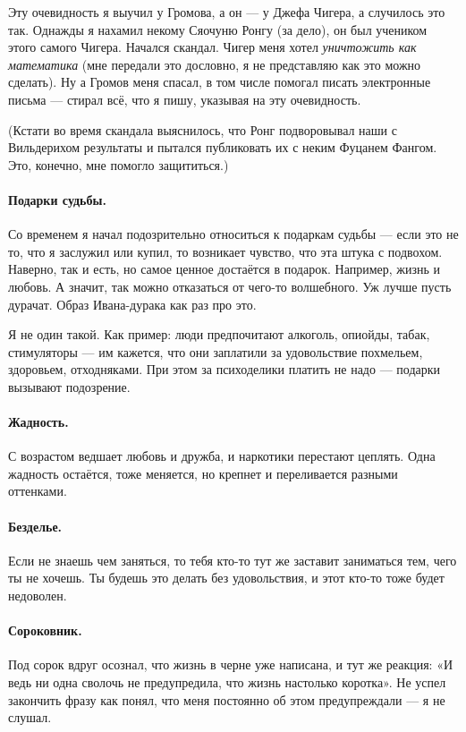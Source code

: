 \documentclass{book}
\begin{document}
Эту очевидность я выучил у Громова, а он --- у Джефа Чигера, а случилось это так.
Однажды я нахамил некому Сяочуню Ронгу (за дело), он был учеником этого самого Чигера.
Начался скандал.
Чигер меня хотел \textit{уничтожить как математика} (мне передали это дословно, я не представляю как это можно сделать).
Ну а Громов меня спасал, в том числе помогал писать электронные письма --- стирал всё, что я пишу, указывая на эту очевидность.

(Кстати во время скандала выяснилось, что Ронг подворовывал наши с Вильдерихом результаты и пытался публиковать их с неким Фуцанем Фангом.
Это, конечно, мне помогло защититься.)

\paragraph{Подарки судьбы.}
Со временем я начал подозрительно относиться к подаркам судьбы --- если это не то, что я заслужил или купил, то возникает чувство, что эта штука с подвохом.
Наверно, так и есть, но самое ценное достаётся в подарок.
Например, жизнь и любовь.
А значит, так можно отказаться от чего-то волшебного.
Уж лучше пусть дурачат.
Образ Ивана-дурака как раз про это.

Я не один такой.
Как пример: люди предпочитают алкоголь, опиойды, табак, стимуляторы --- им кажется, что они заплатили за удовольствие похмельем, здоровьем, отходняками.
При этом за психоделики платить не надо --- подарки вызывают подозрение.

\paragraph{Жадность.}
С возрастом ведшает любовь и дружба, и наркотики перестают цеплять.
Одна жадность остаётся, тоже меняется, но крепнет и переливается разными оттенками.

\paragraph{Безделье.}
Если не знаешь чем заняться, то тебя кто-то тут же заставит заниматься тем, чего ты не хочешь.
Ты будешь это делать без удовольствия, и этот кто-то тоже будет недоволен.


\paragraph{Сороковник.}
Под сорок вдруг осознал, что жизнь в черне уже написана,
и тут же реакция:
«И ведь ни одна сволочь не предупредила, что жизнь настолько коротка».
Не успел закончить фразу как понял, что меня постоянно об этом предупреждали --- я не слушал.
\end{document}
